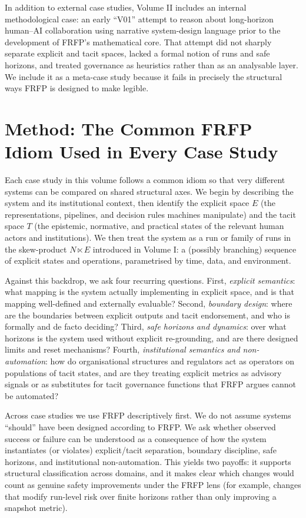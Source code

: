 In addition to external case studies, Volume II includes an internal methodological case: an early ``V01'' attempt to reason about long-horizon human--AI collaboration using narrative system-design language prior to the development of FRFP’s mathematical core. That attempt did not sharply separate explicit and tacit spaces, lacked a formal notion of runs and safe horizons, and treated governance as heuristics rather than as an analysable layer. We include it as a meta-case study because it fails in precisely the structural ways FRFP is designed to make legible.

\section{Method: The Common FRFP Idiom Used in Every Case Study}

Each case study in this volume follows a common idiom so that very different systems can be compared on shared structural axes. We begin by describing the system and its institutional context, then identify the explicit space \(E\) (the representations, pipelines, and decision rules machines manipulate) and the tacit space \(T\) (the epistemic, normative, and practical states of the relevant human actors and institutions). We then treat the system as a run or family of runs in the skew-product \(N \ltimes E\) introduced in Volume I: a (possibly branching) sequence of explicit states and operations, parametrised by time, data, and environment.

Against this backdrop, we ask four recurring questions. First, \emph{explicit semantics}: what mapping is the system actually implementing in explicit space, and is that mapping well-defined and externally evaluable? Second, \emph{boundary design}: where are the boundaries between explicit outputs and tacit endorsement, and who is formally and de facto deciding? Third, \emph{safe horizons and dynamics}: over what horizons is the system used without explicit re-grounding, and are there designed limits and reset mechanisms? Fourth, \emph{institutional semantics and non-automation}: how do organisational structures and regulators act as operators on populations of tacit states, and are they treating explicit metrics as advisory signals or as substitutes for tacit governance functions that FRFP argues cannot be automated?

Across case studies we use FRFP descriptively first. We do not assume systems ``should'' have been designed according to FRFP. We ask whether observed success or failure can be understood as a consequence of how the system instantiates (or violates) explicit/tacit separation, boundary discipline, safe horizons, and institutional non-automation. This yields two payoffs: it supports structural classification across domains, and it makes clear which changes would count as genuine safety improvements under the FRFP lens (for example, changes that modify run-level risk over finite horizons rather than only improving a snapshot metric).

